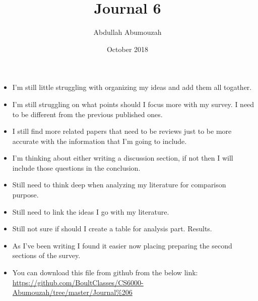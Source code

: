 \documentclass{article}
\title{Journal 6}
\author{Abdullah Abumouzah }
\date{October 2018}
\begin{document}
\maketitle
\begin{itemize}
    \item I'm still little struggling with organizing my ideas and add them all togather.
    \item I'm still struggling on what points should I focus more with my survey. I need to be different from the previous published ones. 
    \item I still find more related papers that need to be reviews just to be more accurate with the information that I'm going to include. 
    \item I'm thinking about either writing a discussion section, if not then I will include those questions in the conclusion.
    \item Still need to think deep when analyzing my literature for comparison purpose.
    \item Still need to link the ideas I go with my literature.
    \item Still not sure if should I create a table for analysis part. Results.
    \item As I've been writing I found it easier now placing preparing the second sections of the survey.
    
    \item You can download this file from github from the below link: \url{https://github.com/BoultClasses/CS6000-Abumouzah/tree/master/Journal%206}
    
    
\end{itemize}
\end{document}
